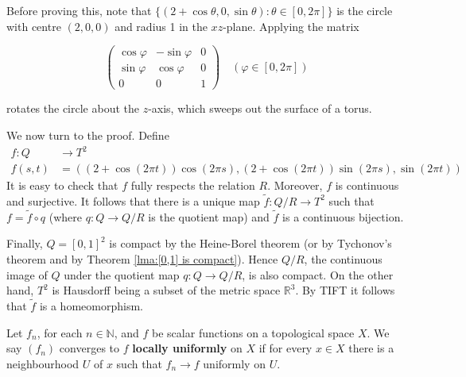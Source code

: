 \documentclass[a4paper,11pt]{article}
\begin{document}
Before proving this, note that $\{(2+\cos \theta, 0, \sin \theta): \theta \in[0,2 \pi]\}$ is the circle with centre $(2,0,0)$ and radius 1 in the $x z$-plane. Applying the matrix

$$
\left(\begin{array}{ccc}
\cos \varphi & -\sin \varphi & 0 \\
\sin \varphi & \cos \varphi & 0 \\
0 & 0 & 1
\end{array}\right) \quad(\varphi \in[0,2 \pi])
$$

rotates the circle about the $z$-axis, which sweeps out the surface of a torus. 

We now turn to the proof. Define
$$
\begin{aligned}
f: Q & \rightarrow T^{2} \\
f(s, t) &=((2+\cos (2 \pi t)) \cos (2 \pi s),(2+\cos (2 \pi t)) \sin (2 \pi s), \sin (2 \pi t))
\end{aligned}
$$
It is easy to check that $f$ fully respects the relation $R$. Moreover, $f$ is continuous and surjective. It follows that there is a unique map $\tilde{f}: Q / R \rightarrow T^{2}$ such that $f=\tilde{f} \circ q$ (where $q: Q \rightarrow Q / R$ is the quotient map) and $\tilde{f}$ is a continuous bijection.

Finally, $Q=[0,1]^{2}$ is compact by the Heine-Borel theorem (or by Tychonov's theorem and by Theorem \ref{lma:[0,1] is compact}). Hence $Q / R$, the continuous image of $Q$ under the quotient map $q: Q \rightarrow Q / R$, is also compact. On the other hand, $T^{2}$ is Hausdorff being a subset of the metric space $\mathbb{R}^{3}$. By TIFT it follows that $\tilde{f}$ is a homeomorphism.

\begin{definition}
    Let $f_{n}$, for each $n \in \mathbb{N}$, and $f$ be scalar functions on a topological space $X$. We say $\left(f_{n}\right)$ converges to $f$ \textbf{locally uniformly} on $X$ if for every $x \in X$ there is a neighbourhood $U$ of $x$ such that $f_{n} \rightarrow f$ uniformly on $U$.
\end{definition}
\end{document}
